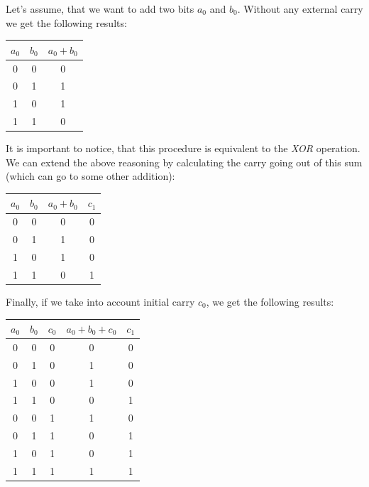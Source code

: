 \begin{example}
Let's assume, that we want to add two bits $a_0$ and $b_0$. Without any external carry we get the following results:

\begin{table}[ht]
    \centering
    \begin{tabular}{|c|c|c|}
    \hline
         $a_0$ & $b_0$ & $a_0 + b_0$ \\ \hline
         0 & 0 & 0 \\
         0 & 1 & 1 \\
         1 & 0 & 1 \\
         1 & 1 & 0\\
         \hline
    \end{tabular}
\end{table}

It is important to notice, that this procedure is equivalent to the \textit{XOR} operation. We can extend the above reasoning by calculating the carry going out of this sum (which can go to some other addition):\newline

\begin{table}[ht]
    \centering
    \begin{tabular}{|c|c|c|c|}
        \hline
         $a_0$ & $b_0$ & $a_0 + b_0$ & $c_1$ \\ \hline
         0 & 0 & 0 & 0 \\
         0 & 1 & 1 & 0 \\
         1 & 0 & 1 & 0 \\
         1 & 1 & 0 & 1 \\
         \hline
    \end{tabular}
\end{table}

Finally, if we take into account initial carry $c_0$, we get the following results:

\begin{table}[ht]
    \centering
    \begin{tabular}{|c|c|c|c|c|}
        \hline
         $a_0$ & $b_0$ & $c_0$ & $a_0 + b_0 + c_0$ & $c_1$ \\ \hline
         0 & 0 & 0 & 0 & 0 \\
         0 & 1 & 0 & 1 & 0 \\
         1 & 0 & 0 & 1 & 0 \\
         1 & 1 & 0 & 0 & 1 \\
         0 & 0 & 1 & 1 & 0 \\
         0 & 1 & 1 & 0 & 1 \\
         1 & 0 & 1 & 0 & 1 \\
         1 & 1 & 1 & 1 & 1 \\
         \hline
    \end{tabular}
\end{table}

\end{example}

